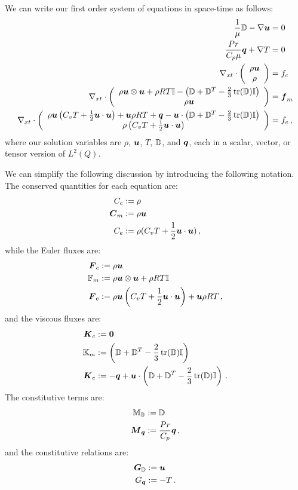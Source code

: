 \documentclass[Dissertation.tex]{subfiles}
\begin{document}
We can write our first order system of equations in space-time as follows:
\begin{subequations}
\label{eq:compressibleNSFirstOrder}
\begin{align}
	\frac{1}{\mu}\mathbb{D}-\nabla\boldsymbol u&=0\\
	\frac{Pr}{C_p\mu}\boldsymbol q+\nabla T&=0\\
	\nabla_{xt}\cdot\left( \begin{array}{c} \rho\boldsymbol u\\ \rho\\ \end{array} \right)&=f_c\\
	\nabla_{xt}\cdot\left( \begin{array}{c} \rho\boldsymbol u\otimes\boldsymbol u+\rho RT\mathbb{I}-\left( \mathbb{D}+\mathbb{D}^T-\frac{2}{3}\operatorname*{tr}(\mathbb{D})\mathbb{I} \right)\\ \rho\boldsymbol u\\ \end{array} \right)&=\boldsymbol f_m\\
	\nabla_{xt}\cdot\left( \begin{array}{c} \rho\boldsymbol u\left( C_v T+\frac{1}{2}\boldsymbol u\cdot\boldsymbol u \right)+\boldsymbol u\rho RT+\boldsymbol q
	-\boldsymbol u\cdot\left( \mathbb{D}+\mathbb{D}^T-\frac{2}{3}\operatorname*{tr}(\mathbb{D})\mathbb{I} \right)\\ \rho\left( C_v T+\frac{1}{2}\boldsymbol u\cdot\boldsymbol u \right)\\ \end{array} \right)&=f_e\,,
\end{align}
\end{subequations}
where our solution variables are $\rho$, $\boldsymbol u$, $T$, $\mathbb{D}$, and $\boldsymbol q$, each in a scalar, vector, or tensor version of $L^2(Q)$.

We can simplify the following discussion by introducing the following notation. 
The conserved quantities for each equation are:
\begin{align*}
C_c&:=\rho\\
\boldsymbol C_m&:=\rho\boldsymbol u\\
C_e&:=\rho(C_v T+\frac{1}{2}\boldsymbol u\cdot\boldsymbol u)\,,
\end{align*}
while the Euler fluxes are:
\begin{align*}
\boldsymbol F_c&:=\rho\boldsymbol u\\
\mathbb{F}_m&:=\rho\boldsymbol u\otimes\boldsymbol u+\rho RT\mathbb{I}\\
\boldsymbol F_e&:=\rho\boldsymbol u\left( C_v T+\frac{1}{2}\boldsymbol u\cdot\boldsymbol u \right)+\boldsymbol u\rho RT\,,
\end{align*}
and the viscous fluxes are:
\begin{align*}
\boldsymbol K_c&:=\boldsymbol 0\\
\mathbb{K}_m&:=\left( \mathbb{D}+\mathbb{D}^T-\frac{2}{3}\operatorname*{tr}(\mathbb{D})\mathbb{I} \right)\\
\boldsymbol K_e&:=-\boldsymbol q+\boldsymbol u\cdot\left( \mathbb{D}+\mathbb{D}^T-\frac{2}{3}\operatorname*{tr}(\mathbb{D})\mathbb{I} \right)\,.
\end{align*}
The constitutive terms are:
\begin{align*}
\mathbb{M}_{\mathbb{D}}&:=\mathbb{D}\\
\boldsymbol M_{\boldsymbol q}&:=\frac{Pr}{C_p}\boldsymbol q\,,
\end{align*}
and the constitutive relations are:
\begin{align*}
\boldsymbol G_{\mathbb{D}}&:=\boldsymbol u\\
G_{\boldsymbol q}&:=-T\,.
\end{align*}
\end{document}

